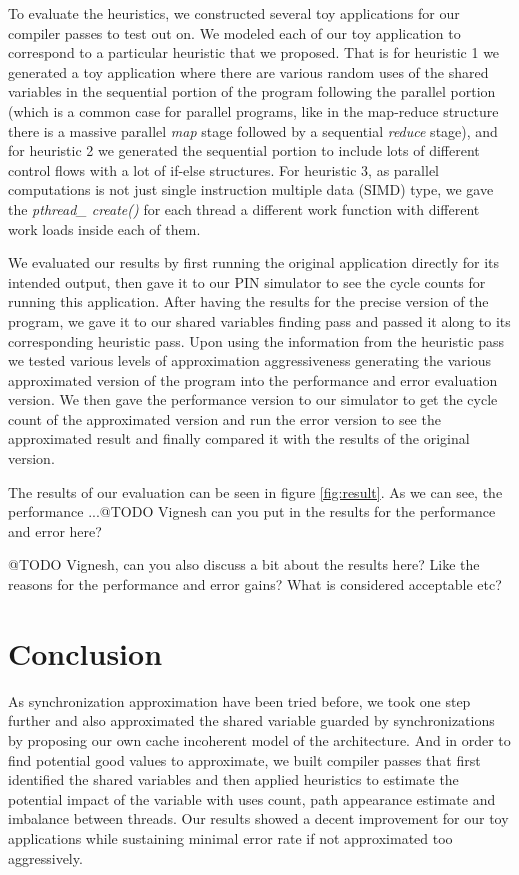 \documentclass[12pt,conference]{IEEEtran}
\begin{document}
To evaluate the heuristics, we constructed several toy applications for our compiler 
passes to test out on. We modeled each of our toy application to correspond to a
particular heuristic that we proposed. That is for heuristic 1 we generated a toy
application where there are various random uses of the shared variables in the
sequential portion of the program following the parallel portion (which is a
common case for parallel programs, like in the map-reduce structure there is
a massive parallel \emph{map} stage followed by a sequential \emph{reduce} stage),
and for heuristic 2 we generated the sequential portion to include lots of different
control flows with a lot of if-else structures. For heuristic 3, as parallel
computations is not just single instruction multiple data (SIMD) type, we gave 
the \textit{pthread\_ create()} for each thread a different work function
with different work loads inside each of them.

We evaluated our results by first running the original application directly for
its intended output, then gave it to our PIN simulator to see the cycle
counts for running this application. After having the results for the precise
version of the program, we gave it to our shared variables finding pass and
passed it along to its corresponding heuristic pass. Upon using the information
from the heuristic pass we tested various levels of approximation aggressiveness
generating the various approximated version of the program into the performance
and error evaluation version. We then gave the performance version to our simulator
to get the cycle count of the approximated version and run the error version to
see the approximated result and finally compared it with the results of the
original version.

The results of our evaluation can be seen in figure \ref{fig:result}. As we can
see, the performance ...@TODO Vignesh can you put in the results for the
performance and error here?

@TODO Vignesh, can you also discuss a bit about the results here? Like the reasons
for the performance and error gains? What is considered acceptable etc?

\section{Conclusion}

As synchronization approximation have been tried before, we took one step further
and also approximated the shared variable guarded by synchronizations by proposing
our own cache incoherent model of the architecture. And in order to find potential
good values to approximate, we built compiler passes that first identified the 
shared variables and then applied heuristics to estimate the potential impact of 
the variable with uses count, path appearance estimate and imbalance between threads.
Our results showed a decent improvement for our toy applications while sustaining 
minimal error rate if not approximated too aggressively.
\end{document}

